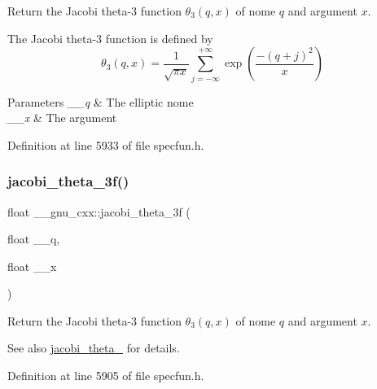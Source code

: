 Return the Jacobi theta-\/3 function $ \theta_3(q,x) $ of nome $ q $ and argument $ x $.

The Jacobi theta-\/3 function is defined by \[ \theta_3(q,x) = \frac{1}{\sqrt{\pi x}} \sum_{j=-\infty}^{+\infty} \exp\left( \frac{-(q+j)^2}{x} \right) \]


\begin{DoxyParams}{Parameters}
{\em \+\_\+\+\_\+q} & The elliptic nome \\
\hline
{\em \+\_\+\+\_\+x} & The argument \\
\hline
\end{DoxyParams}


Definition at line 5933 of file specfun.\+h.

\mbox{\label{group__gnu__math__spec__func_ga6ff9738978be029e90e1f144ab4aa165}} 
\subsubsection{\texorpdfstring{jacobi\+\_\+theta\+\_\+3f()}{jacobi\_theta\_3f()}}
{\footnotesize\ttfamily float \+\_\+\+\_\+gnu\+\_\+cxx\+::jacobi\+\_\+theta\+\_\+3f (\begin{DoxyParamCaption}\item[{float}]{\+\_\+\+\_\+q,  }\item[{float}]{\+\_\+\+\_\+x }\end{DoxyParamCaption})\hspace{0.3cm}{\ttfamily [inline]}}

Return the Jacobi theta-\/3 function $ \theta_3(q,x) $ of nome $ q $ and argument $ x $.

\begin{DoxySeeAlso}{See also}
\hyperlink{group__gnu__math__spec__func_gaf4eac2990db1dadba66ae688ceaa6403}{jacobi\+\_\+theta\+\_} for details. 
\end{DoxySeeAlso}


Definition at line 5905 of file specfun.\+h.

\mbox{\label{group__gnu__math__spec__func_ga313109bbf08d81e93196eb73c2047dd2}} 
